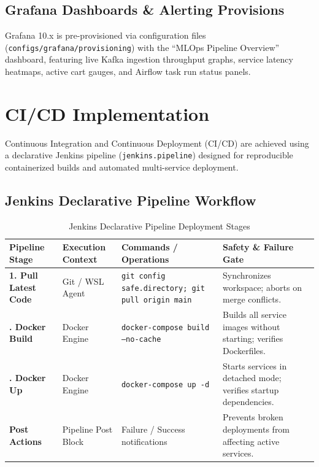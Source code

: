 \documentclass[11pt,a4paper]{article}
\begin{document}
\subsection{Grafana Dashboards \& Alerting Provisions}
Grafana 10.x is pre-provisioned via configuration files (\texttt{configs/grafana/provisioning}) with the ``MLOps Pipeline Overview'' dashboard, featuring live Kafka ingestion throughput graphs, service latency heatmaps, active cart gauges, and Airflow task run status panels.

\section{CI/CD Implementation}

Continuous Integration and Continuous Deployment (CI/CD) are achieved using a declarative Jenkins pipeline (\texttt{jenkins.pipeline}) designed for reproducible containerized builds and automated multi-service deployment.

\subsection{Jenkins Declarative Pipeline Workflow}

\begin{table}[h]
\centering
\small
\begin{tabularx}{\textwidth}{@{}>{\bfseries}p{3.2cm}p{2.8cm}p{5.0cm}X@{}}
\toprule
\color{DeepNavy}Pipeline Stage & \color{DeepNavy}Execution Context & \color{DeepNavy}Commands / Operations & \color{DeepNavy}Safety \& Failure Gate \\
\midrule
1. Pull Latest Code & Git / WSL Agent & \texttt{git config safe.directory; git pull origin main} & Synchronizes workspace; aborts on merge conflicts. \\
\addlinespace
2. Docker Build & Docker Engine & \texttt{docker-compose build --no-cache} & Builds all service images without starting; verifies Dockerfiles. \\
\addlinespace
3. Docker Up & Docker Engine & \texttt{docker-compose up -d} & Starts services in detached mode; verifies startup dependencies. \\
\addlinespace
Post Actions & Pipeline Post Block & Failure / Success notifications & Prevents broken deployments from affecting active services. \\
\bottomrule
\end{tabularx}
\caption{Jenkins Declarative Pipeline Deployment Stages}
\end{table}
\end{document}
